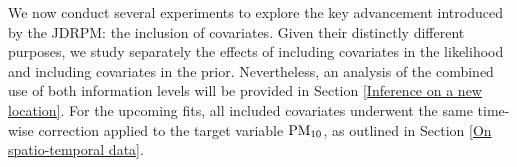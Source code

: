 \documentclass[12pt,	%
	a4paper,		%
	twoside,		%
	openright,		%
	titlepage,%
	]{book}
\theoremstyle{definition}
\begin{document}

We now conduct several experiments to explore the key advancement introduced by the JDRPM: the inclusion of covariates. Given their distinctly different purposes, we study separately the effects of including covariates in the likelihood and including covariates in the prior. Nevertheless, an analysis of the combined use of both information levels will be provided in Section \ref{Inference on a new location}. For the upcoming fits, all included covariates underwent the same time-wise correction applied to the target variable $\text{PM}_{10}$, as outlined in Section \ref{On spatio-temporal data}.
\end{document}
